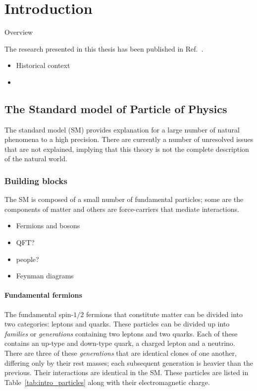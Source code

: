 \chapter{Introduction} 
\label{ch:introduction}

\minitoc 



Overview 

The research presented in this thesis has been published in Ref.~\cite{LHCb-PAPER-2017-032}. 

{\color{Red}
\begin{itemize}
\item Historical context 
\item 
\end{itemize}}



\section{The Standard model of Particle of Physics}

The standard model (SM) provides explanation for a large number of natural phenomena to a high precision. There are currently a number of unresolved issues that are not explained, implying that this theory is not the complete description of the natural world.



\subsection{Building blocks}

The SM is composed of a small number of fundamental particles; some are the components of matter and others are force-carriers that mediate interactions.




{\color{Red}
\begin{itemize}
\item Fermions and bosons
\item QFT?
\item people?
\item Feynman diagrams
\end{itemize}}

\subsubsection{Fundamental fermions}

The fundamental spin-$1/2$ fermions that constitute matter can be divided into two categories: leptons and quarks. 
These particles can be divided up into \emph{families} or \emph{generations} containing two leptons and two quarks. Each of these contains an up-type and down-type quark, a charged lepton and a neutrino. There are three of these \emph{generations} that are identical clones of one another, differing only by their rest masses; each subsequent generation is heavier than the previous. Their interactions are identical in the SM. 
These particles are listed in Table~\ref{tab:intro_particles} along with their electromagnetic charge.




